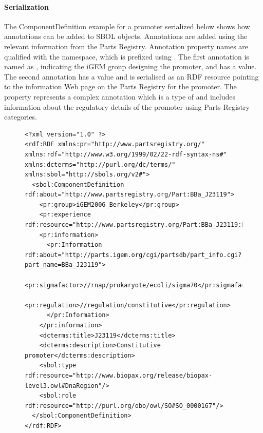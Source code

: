 \paragraph{Serialization}
The ComponentDefinition example for a promoter serialized below shows how annotations can be added to SBOL objects. Annotations are added using the relevant information from the Parts Registry. Annotation property names are qualified with the  namespace, which is prefixed using . The first annotation is named as , indicating the iGEM group designing the promoter, and has a  value. The second  annotation has a  value and is serialised as an RDF resource pointing to the information Web page on the Parts Registry for the promoter. The   property represents a complex annotation which is a type of  and includes information about the regulatory details of the promoter using Parts Registry categories.   

\begin{figure} [ht]
\begin{lstlisting}
<?xml version="1.0" ?>
<rdf:RDF xmlns:pr="http://www.partsregistry.org/" xmlns:rdf="http://www.w3.org/1999/02/22-rdf-syntax-ns#" xmlns:dcterms="http://purl.org/dc/terms/" xmlns:sbol="http://sbols.org/v2#">
  <sbol:ComponentDefinition rdf:about="http://www.partsregistry.org/Part:BBa_J23119">
    <pr:group>iGEM2006_Berkeley</pr:group>
    <pr:experience rdf:resource="http://www.partsregistry.org/Part:BBa_J23119:Experience"/>
    <pr:information>
      <pr:Information rdf:about="http://parts.igem.org/cgi/partsdb/part_info.cgi?part_name=BBa_J23119">
        <pr:sigmafactor>//rnap/prokaryote/ecoli/sigma70</pr:sigmafactor>
        <pr:regulation>//regulation/constitutive</pr:regulation>
      </pr:Information>
    </pr:information>
    <dcterms:title>J23119</dcterms:title>
    <dcterms:description>Constitutive promoter</dcterms:description>
    <sbol:type rdf:resource="http://www.biopax.org/release/biopax-level3.owl#DnaRegion"/>
    <sbol:role rdf:resource="http://purl.org/obo/owl/SO#SO_0000167"/>
  </sbol:ComponentDefinition>
</rdf:RDF>
\end{lstlisting}
\label{ser:Annotation}
\end{figure}




